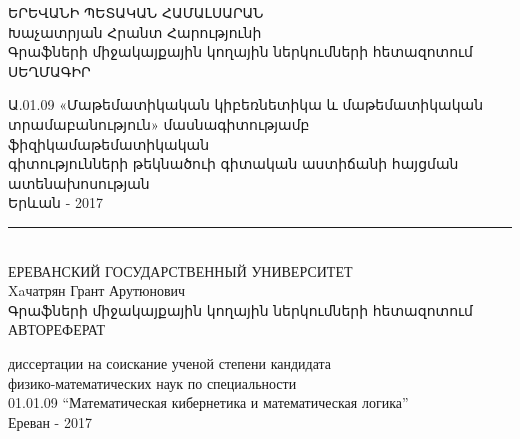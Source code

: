 \thispagestyle{empty}
\begin{center}

\textsc{ԵՐԵՎԱՆԻ ՊԵՏԱԿԱՆ ՀԱՄԱԼՍԱՐԱՆ}\\[1cm]

{Խաչատրյան Հրանտ Հարությունի\\[0.5cm]}
{Գրաֆների միջակայքային կողային ներկումների հետազոտում\\[1cm]}
{ՍԵՂՄԱԳԻՐ \\[1cm]}

Ա.01.09 «Մաթեմատիկական կիբեռնետիկա և  
մաթեմատիկական \\ տրամաբանություն» մասնագիտությամբ ֆիզիկամաթեմատիկական \\ գիտությունների թեկնածուի գիտական աստիճանի հայցման ատենախոսության \\[1cm]

Երևան - 2017\\[0.3cm]
\rule{\textwidth}{1pt}\\[0.5cm]

\textsc{ЕРЕВАНСКИЙ ГОСУДАРСТВЕННЫЙ УНИВЕРСИТЕТ}\\[1cm]

{Xaчатрян Грант Арутюнович\\[0.5cm]}
{Գրաֆների միջակայքային կողային ներկումների հետազոտում\\[1cm]}
{АВТОРЕФЕРАТ \\[1cm]}

диссертации на соискание ученой степени кандидата \\
физико-математических наук по специальности\\ 01.01.09 “Математическая кибернетика и математическая логика” \\[1cm]

Ереван - 2017\\[0.2cm]


\end{center}

